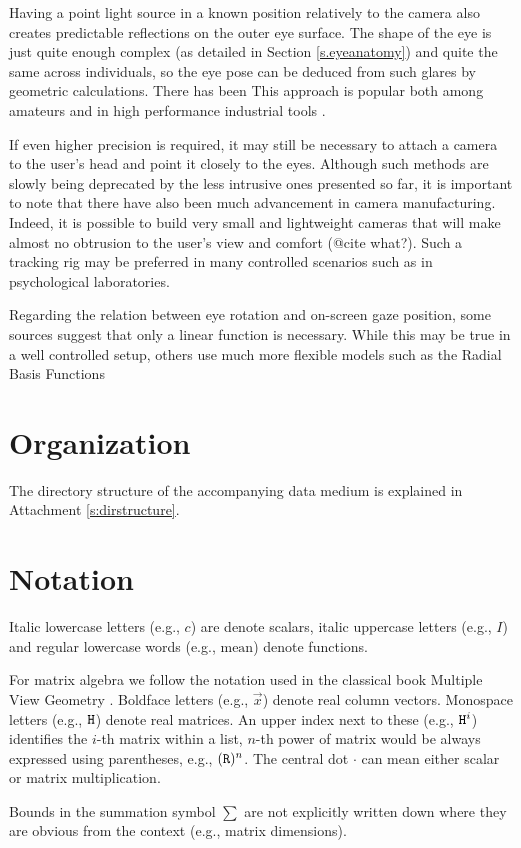 Having a point light source in a known position relatively to the camera also creates predictable reflections on the outer eye surface.
The shape of the eye is just quite enough complex (as detailed in Section \ref{s.eyeanatomy}) and quite the same across individuals, so the eye pose can be deduced from such glares by geometric calculations.
There has been \todo{\dots}\cite{b:villanueva08}
This approach is popular both among amateurs \cite{b:yucel09}\cite{b:wolski16} and in high performance industrial tools \cite{p:tobii}.

If even higher precision is required, it may still be necessary to attach a camera to the user's head and point it closely to the eyes.
Although such methods are slowly being deprecated by the less intrusive ones presented so far, it is important to note that there have also been much advancement in camera manufacturing.
Indeed, it is possible to build very small and lightweight cameras that will make almost no obtrusion to the user's view and comfort (@cite what?).
Such a tracking rig may be preferred in many controlled scenarios such as in psychological laboratories.



Regarding the relation between eye rotation and on-screen gaze position, some sources suggest that only a linear function is necessary.\cite{b:zhu12}
While this may be true in a well controlled setup, others use much more flexible models such as the Radial Basis Functions 

\section{Organization}

The directory structure of the accompanying data medium is explained in Attachment \ref{s:dirstructure}.

\section{Notation}

Italic lowercase letters (e.g., $c$) are denote scalars, italic uppercase letters (e.g., $I$) and regular lowercase words (e.g., $\mathrm{mean}$) denote functions.

For matrix algebra we follow the notation used in the classical book Multiple View Geometry \cite{b:hartley03}.
Boldface letters (e.g., $\vec x$) denote real column vectors.
Monospace letters (e.g., $\mathtt{H}$) denote real matrices.
An upper index next to these (e.g., $\mathtt{H}^i$) identifies the $i$-th matrix within a list, $n$-th power of matrix would be always expressed using parentheses, e.g., $(\mathtt{R})^n$.
The central dot $\cdot$ can mean either scalar or matrix multiplication.

Bounds in the summation symbol $\sum$ are not explicitly written down where they are obvious from the context (e.g., matrix dimensions).

\todo{$\diag$}
